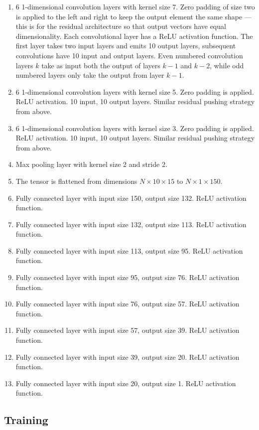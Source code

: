 \begin{enumerate}
\item 6 1-dimensional convolution layers with kernel size 7.  Zero padding of size two is applied to the left and right to keep the output element the same shape --- this is for the residual architecture so that output vectors have equal dimensionality.  Each convolutional layer has a ReLU activation function.  The first layer takes two input layers and emits 10 output layers, subsequent convolutions have 10 input and output layers.  Even numbered convolution layers $k$ take as input both the output of layers $k-1$ and $k-2$, while odd numbered layers only take the output from layer $k-1$.
\item 6 1-dimensional convolution layers with kernel size 5.  Zero padding is applied.  ReLU activation.  10 input, 10 output layers.  Similar residual pushing strategy from above.
\item 6 1-dimensional convolution layers with kernel size 3.  Zero padding is applied.  ReLU activation.  10 input, 10 output layers.  Similar residual pushing strategy from above.
\item Max pooling layer with kernel size 2 and stride 2.
\item The tensor is flattened from dimensions $N \times 10 \times 15$ to $N \times 1 \times 150$.
\item Fully connected layer with input size 150, output size 132.  ReLU activation function.
\item Fully connected layer with input size 132, output size 113.  ReLU activation function.
\item Fully connected layer with input size 113, output size 95.  ReLU activation function.
\item Fully connected layer with input size 95, output size 76.  ReLU activation function.
\item Fully connected layer with input size 76, output size 57.  ReLU activation function.
\item Fully connected layer with input size 57, output size 39.  ReLU activation function.
\item Fully connected layer with input size 39, output size 20.  ReLU activation function.
\item Fully connected layer with input size 20, output size 1.  ReLU activation function.
\end{enumerate}

\subsection{Training}

